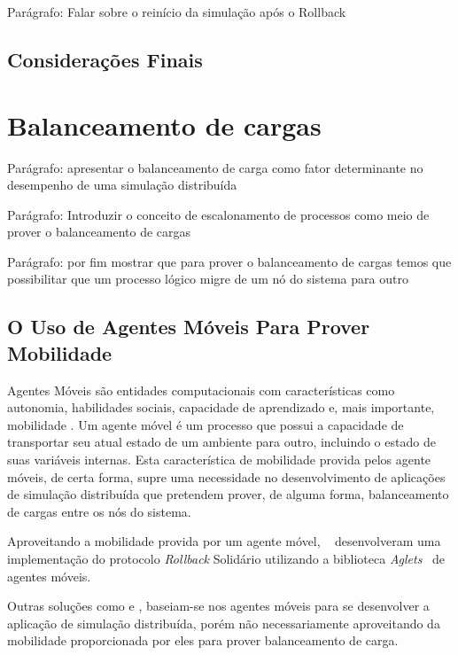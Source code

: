 Parágrafo: Falar sobre o reinício da simulação após o Rollback

\subsection{Considerações Finais}


\section{Balanceamento de cargas}

Parágrafo: apresentar o balanceamento de carga como fator determinante no desempenho de uma simulação distribuída

Parágrafo: Introduzir o conceito de escalonamento de processos como meio de prover o balanceamento de cargas

Parágrafo: por fim mostrar que para prover o balanceamento de cargas temos que possibilitar que um processo lógico migre de um nó do sistema para outro

\subsection{O Uso de Agentes Móveis Para Prover Mobilidade}


Agentes Móveis são entidades computacionais com características como autonomia, habilidades sociais, capacidade de aprendizado e, mais importante, mobilidade \cite{MOBILE-AGENTS-WIKIPEDIA}. Um agente móvel é um processo que possui a capacidade de transportar seu atual estado de um ambiente para outro, incluindo o estado de suas variáveis internas. Esta característica de mobilidade provida pelos agente móveis, de certa forma, supre uma necessidade no desenvolvimento de aplicações de simulação distribuída que pretendem prover, de alguma forma, balanceamento de cargas entre os nós do sistema.


Aproveitando a mobilidade provida por um agente móvel, ~\cite{RIBEIROALVES} desenvolveram uma implementação do protocolo \textit{Rollback} Solidário utilizando a biblioteca \textit{Aglets}~\cite{AGLETS} de agentes móveis.


Outras soluções como \cite{SASSY} e \cite{}, baseiam-se nos agentes móveis para se desenvolver a aplicação de simulação distribuída, porém não necessariamente aproveitando da mobilidade proporcionada por eles para prover balanceamento de carga.

